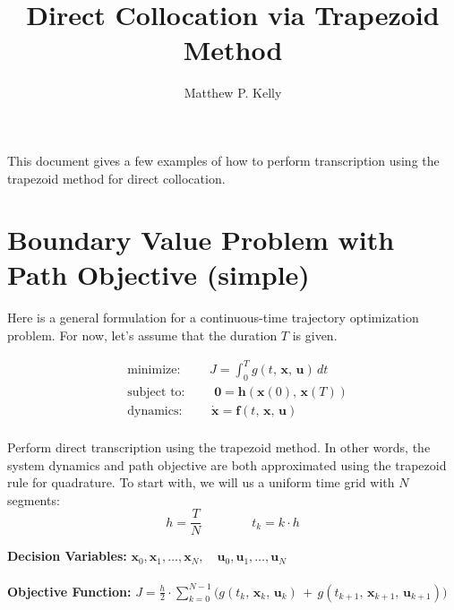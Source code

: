 

\title{Direct Collocation via Trapezoid Method}
\author{Matthew P. Kelly}

\maketitle

\begin{abstract*}
This document gives a few examples of how to perform transcription using the
trapezoid method for direct collocation.
\end{abstract*}

\section{Boundary Value Problem with Path Objective (simple)}

Here is a general formulation for a continuous-time trajectory optimization problem.
For now, let's assume that the duration $T$ is given.

\begin{align*}
  & \text{minimize: } \qquad J = \int_0^T \! g(t,\, \bm{x},\, \bm{u}) \, dt \\
  & \text{subject to: } \qquad \bm{0} = \bm{h}(\bm{x}(0), \, \bm{x}(T)) \\
  & \text{dynamics: } \qquad \dot{\bm{x}} = \bm{f}(t,\, \bm{x},\, \bm{u}) \\
\end{align*}

Perform direct transcription using the trapezoid method. In other words,
the system dynamics and path objective are both approximated
using the trapezoid rule for quadrature.
To start with, we will us a uniform time grid with $N$ segments:
\begin{equation*}
  h = \frac{T}{N}  \quad \quad \quad \quad t_k = k \cdot h
\end{equation*}

\textbf{Decision Variables: }  $\displaystyle
  \bm{x}_0, \bm{x}_1, \dots ,\bm{x}_N, \quad \bm{u}_0, \bm{u}_1, \dots, \bm{u}_N
$ \\ \vspace{1em} \\

\textbf{Objective Function: } $\displaystyle
  J = \frac{h}{2} \cdot \sum_{k=0}^{N-1} \Big(
  g(t_k,\,  \bm{x}_k,\,  \bm{u}_k)
  \, + \,
  g(t_{k+1},\,  \bm{x}_{k+1},\,  \bm{u}_{k+1}) \Big)
$ \\ \vspace{1em} \\

